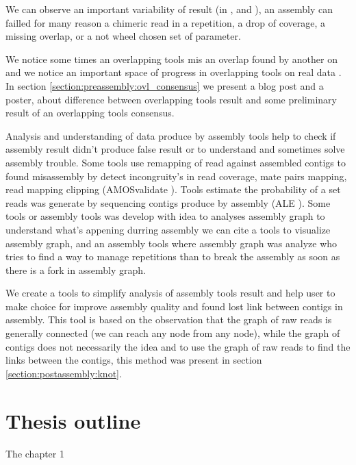 \documentclass[./main.tex]{subfiles}
\begin{document}
We can observe an important variability of result (in \canu, \wtdbg and ), an assembly can failled for many reason a chimeric read in a repetition, a drop of coverage, a missing overlap, or a not wheel chosen set of parameter.

We notice some times an overlapping tools mis an overlap found by another on and we notice an important space of progress in overlapping tools on real data \cite{ovl_bench}. In section \ref{section:preassembly:ovl_consensus} we present a blog post and a poster, about difference between overlapping tools result and some preliminary result of an overlapping tools consensus.


Analysis and understanding of data produce by assembly tools help to check if assembly result didn't produce false result or to understand and sometimes solve assembly trouble. Some tools use remapping of read against assembled contigs to found misassembly by detect incongruity's in read coverage, mate pairs mapping, read mapping clipping (AMOSvalidate \cite{amosvalidate}).
Tools estimate the probability of a set reads was generate by sequencing contigs produce by assembly (ALE \cite{ALE}). 
Some tools or assembly tools was develop with idea to analyses assembly graph to understand what's appening durring assembly we can cite  \cite{bandage} a tools to visualize assembly graph, and \hinge \cite{hinge} an assembly tools where assembly graph was analyze who tries to find a way to manage repetitions than to break the assembly as soon as there is a fork in assembly graph.

We create \knot a tools to simplify analysis of assembly tools result and help user to make choice for improve assembly quality and found lost link between contigs in assembly. This tool is based on the observation that the graph of raw reads is generally connected (we can reach any node from any node), while the graph of contigs does not necessarily the idea and to use the graph of raw reads to find the links between the contigs, this method was present in section \ref{section:postassembly:knot}.

\section{Thesis outline}

The chapter 1 



\end{document}
